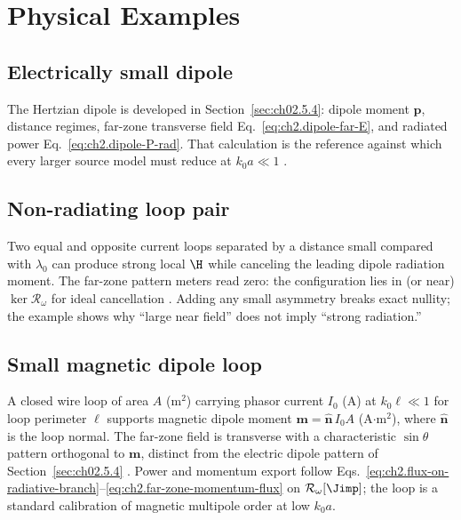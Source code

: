 
\section{Physical Examples}
\label{sec:ch02.11}

\subsection{Electrically small dipole}
\label{sec:ch02.11.1}

The Hertzian dipole is developed in Section~\ref{sec:ch02.5.4}: dipole moment $\mathbf{p}$, distance regimes, far-zone transverse field Eq.~\eqref{eq:ch2.dipole-far-E}, and radiated power Eq.~\eqref{eq:ch2.dipole-P-rad}. That calculation is the reference against which every larger source model must reduce at $k_0 a\ll1$ \cite{jackson1999,chu1948}.

\subsection{Non-radiating loop pair}
\label{sec:ch02.11.2}

Two equal and opposite current loops separated by a distance small compared with $\lambda_0$ can produce strong local $\H$ while canceling the leading dipole radiation moment. The far-zone pattern meters read zero: the configuration lies in (or near) $\ker\mathcal{R}_\omega$ for ideal cancellation \cite{devaney2004,harrington2001}. Adding any small asymmetry breaks exact nullity; the example shows why ``large near field'' does not imply ``strong radiation.''

\subsection{Small magnetic dipole loop}
\label{sec:ch02.11.3}

A closed wire loop of area $A$ (m$^2$) carrying phasor current $I_0$ (A) at $k_0\ell\ll1$ for loop perimeter $\ell$ supports magnetic dipole moment $\mathbf{m}=\hat{\mathbf{n}}\,I_0 A$ (A$\cdot$m$^2$), where $\hat{\mathbf{n}}$ is the loop normal. The far-zone field is transverse with a characteristic $\sin\theta$ pattern orthogonal to $\mathbf{m}$, distinct from the electric dipole pattern of Section~\ref{sec:ch02.5.4} \cite{jackson1999,stratton1941}. Power and momentum export follow Eqs.~\eqref{eq:ch2.flux-on-radiative-branch}--\eqref{eq:ch2.far-zone-momentum-flux} on $\mathcal{R}_\omega[\Jimp]$; the loop is a standard calibration of magnetic multipole order at low $k_0 a$.

